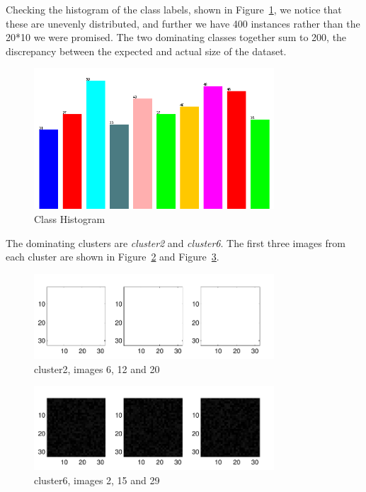 \documentclass[a4paper]{article}
\begin{document}
\clearpage

Checking the histogram of the class labels, shown in Figure~\ref{fig:a2img2}, we notice that these are unevenly distributed, and further we have 400 instances rather than the 20*10 we were promised. The two dominating classes together sum to 200, the discrepancy between the expected and actual size of the dataset.

\begin{figure}[!htbp]
\centering
\includegraphics[width=0.8\textwidth]{A2-img2-classes-cropped.png}
\caption{Class Histogram}
\label{fig:a2img2}
\end{figure}

The dominating clusters are {\it cluster2} and {\it cluster6}. The first three images from each cluster are shown in Figure~\ref{fig:a2img3} and Figure~\ref{fig:a2img4}.

\begin{figure}[!htbp]
\centering
\includegraphics[width=0.8\textwidth]{A2-img3-cluster2-cropped.pdf}
\caption{cluster2, images 6, 12 and 20}
\label{fig:a2img3}
\end{figure}

\begin{figure}[!htbp]
\centering
\includegraphics[width=0.8\textwidth]{A2-img4-cluster6-cropped.pdf}
\caption{cluster6, images 2, 15 and 29}
\label{fig:a2img4}
\end{figure}
\end{document}

